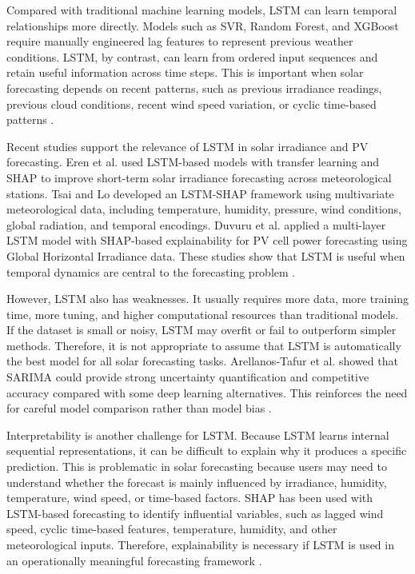 Compared with traditional machine learning models, LSTM can learn temporal relationships more directly. Models such as SVR, Random Forest, and XGBoost require manually engineered lag features to represent previous weather conditions. LSTM, by contrast, can learn from ordered input sequences and retain useful information across time steps. This is important when solar forecasting depends on recent patterns, such as previous irradiance readings, previous cloud conditions, recent wind speed variation, or cyclic time-based patterns \parencite{Eren2025, TsaiLo2025, Duvuru2026}.

Recent studies support the relevance of LSTM in solar irradiance and PV forecasting. Eren et al. used LSTM-based models with transfer learning and SHAP to improve short-term solar irradiance forecasting across meteorological stations. Tsai and Lo developed an LSTM-SHAP framework using multivariate meteorological data, including temperature, humidity, pressure, wind conditions, global radiation, and temporal encodings. Duvuru et al. applied a multi-layer LSTM model with SHAP-based explainability for PV cell power forecasting using Global Horizontal Irradiance data. These studies show that LSTM is useful when temporal dynamics are central to the forecasting problem \parencite{Eren2025, TsaiLo2025, Duvuru2026}.

However, LSTM also has weaknesses. It usually requires more data, more training time, more tuning, and higher computational resources than traditional models. If the dataset is small or noisy, LSTM may overfit or fail to outperform simpler methods. Therefore, it is not appropriate to assume that LSTM is automatically the best model for all solar forecasting tasks. Arellanos-Tafur et al. showed that SARIMA could provide strong uncertainty quantification and competitive accuracy compared with some deep learning alternatives. This reinforces the need for careful model comparison rather than model bias \parencite{ArellanosTafur2025, CarvalhoJunior2025, Eren2025}.

Interpretability is another challenge for LSTM. Because LSTM learns internal sequential representations, it can be difficult to explain why it produces a specific prediction. This is problematic in solar forecasting because users may need to understand whether the forecast is mainly influenced by irradiance, humidity, temperature, wind speed, or time-based factors. SHAP has been used with LSTM-based forecasting to identify influential variables, such as lagged wind speed, cyclic time-based features, temperature, humidity, and other meteorological inputs. Therefore, explainability is necessary if LSTM is used in an operationally meaningful forecasting framework \parencite{Eren2025, TsaiLo2025, Duvuru2026}.

